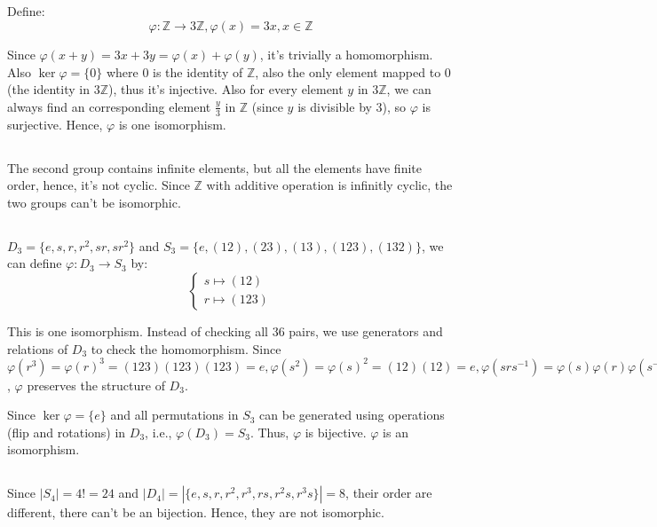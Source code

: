 \documentclass[12pt]{article}
\begin{document}
\subsection{} %
Define:
$$\varphi:\mathbb{Z}\rightarrow 3\mathbb Z,\varphi(x)=3x,x\in\mathbb Z$$ 

Since $\varphi(x+y)=3x+3y=\varphi(x)+\varphi(y)$, it's trivially a homomorphism. Also $\ker{\varphi}=\{0\}$ where $0$ is the identity of $\mathbb Z$, also the only element mapped to $0$ (the identity in $3\mathbb Z$), thus it's injective. Also for every element $y$ in $3\mathbb Z$, we can always find an corresponding element $\frac{y}{3}$ in $\mathbb Z$ (since $y$ is divisible by $3$), so $\varphi$ is surjective. Hence, $\varphi$ is one isomorphism.

\subsection{} %
The second group contains infinite elements, but all the elements have finite order, hence, it's not cyclic. Since $\mathbb Z$ with additive operation is infinitly cyclic, the two groups can't be isomorphic.
\subsection{} %
$D_3=\{e,s,r,r^2,sr,sr^2\}$ and $S_3=\{e,(12),(23),(13),(123),(132)\}$, we can define $\varphi:D_3\rightarrow S_3$ by:
$$\begin{cases}s\mapsto (12) \\ r\mapsto (123)\end{cases}$$

This is one isomorphism. Instead of checking all 36 pairs, we use generators and relations of $D_3$ to check the homomorphism. Since $\varphi(r^3)=\varphi(r)^3=(123)(123)(123)=e,\varphi(s^2)=\varphi(s)^2=(12)(12)=e,\varphi(srs^{-1})=\varphi(s)\varphi(r)\varphi(s^{-1})=(12)(123)(12)=(132)=(123)^{-1}$, $\varphi$ preserves the structure of $D_3$.

Since $\ker\varphi=\{e\}$ and all permutations in $S_3$ can be generated using operations (flip and rotations) in $D_3$, i.e., $\varphi{(D_3)}=S_3$. Thus, $\varphi$ is bijective. $\varphi$ is an isomorphism.


\subsection{} %
Since $|S_4|=4!=24$ and $|D_4|=|\{e,s,r,r^2,r^3,rs,r^2s,r^3s\}|=8$, their order are different, there can't be an bijection. Hence, they are not isomorphic.
\end{document}
